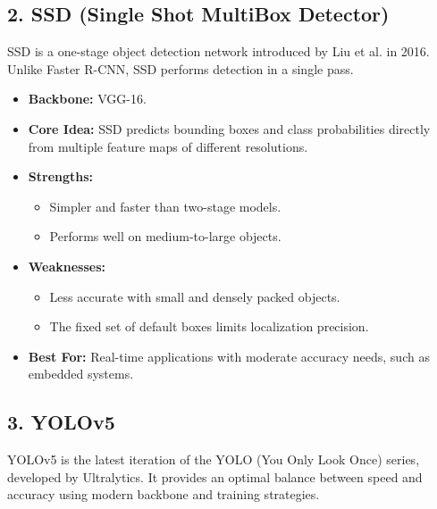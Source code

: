 \documentclass[12pt]{article}
\begin{document}
\subsection*{2. SSD (Single Shot MultiBox Detector)}

SSD is a one-stage object detection network introduced by Liu et al. in 2016. Unlike Faster R-CNN, SSD performs detection in a single pass.

\begin{itemize}
    \item \textbf{Backbone:} VGG-16.
    \item \textbf{Core Idea:} SSD predicts bounding boxes and class probabilities directly from multiple feature maps of different resolutions.
    \item \textbf{Strengths:}
    \begin{itemize}
        \item Simpler and faster than two-stage models.
        \item Performs well on medium-to-large objects.
    \end{itemize}
    \item \textbf{Weaknesses:}
    \begin{itemize}
        \item Less accurate with small and densely packed objects.
        \item The fixed set of default boxes limits localization precision.
    \end{itemize}
    \item \textbf{Best For:} Real-time applications with moderate accuracy needs, such as embedded systems.
\end{itemize}

\subsection*{3. YOLOv5}

YOLOv5 is the latest iteration of the YOLO (You Only Look Once) series, developed by Ultralytics. It provides an optimal balance between speed and accuracy using modern backbone and training strategies.
\end{document}
